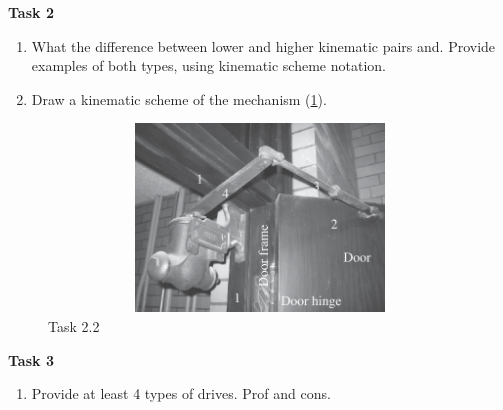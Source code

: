 \documentclass[12pt]{article}
\newcommand\pic[1]{(\cref{#1})} %
\begin{document}
\textbf{Task 2}
\begin{enumerate}
    \item What the difference between lower and higher kinematic pairs and. Provide examples of both types, using kinematic scheme notation.
    \item Draw a kinematic scheme of the mechanism \pic{fig:resources_quiz_1/quiz1_task2.png}.
\end{enumerate}
\begin{figure}[H]
    \centering\includegraphics[height=5cm,width=1\textwidth,keepaspectratio]{resources_quiz_1/quiz1_task2.png}
    \caption{Task 2.2}
    \label{fig:resources_quiz_1/quiz1_task2.png}
\end{figure}

\textbf{Task 3}
\begin{enumerate}
    \item Provide at least 4 types of drives. Prof and cons.
\end{enumerate}

\end{document}
